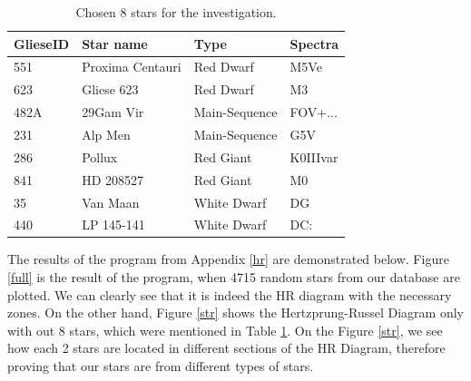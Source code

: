 \documentclass[a4paper,12pt]{article}
\begin{document}
  \begin{table}[h!]
    \begin{center}
      \caption{Chosen 8 stars for the investigation.}
      \begin{tabular}{l | l | l | l}
        \textbf{GlieseID} & \textbf{Star name} & \textbf{Type} & \textbf{Spectra}\\
        \hline
        551 & Proxima Centauri & Red Dwarf & M5Ve\\
        623 & Gliese 623 & Red Dwarf & M3\\
        482A & 29Gam Vir & Main-Sequence & FOV+...\\
        231 & Alp Men & Main-Sequence & G5V\\
        286 & Pollux & Red Giant & K0IIIvar\\
        841 & HD 208527 & Red Giant & M0\\
        35 & Van Maan & White Dwarf & DG\\
        440 & LP 145-141 & White Dwarf & DC:\\
      \end{tabular}
      \label{stars}
    \end{center}
  \end{table}
  
  The results of the program from Appendix \ref{hr} are demonstrated below. Figure \ref{full} is the result of the program, when 4715 random stars from our database are plotted. We can clearly see that it is indeed the HR diagram with the necessary zones. On the other hand, Figure \ref{str} shows the Hertzprung-Russel Diagram only with out 8 stars, which were mentioned in Table \ref{stars}. On the Figure \ref{str}, we see how each 2 stars are located in different sections of the HR Diagram, therefore proving that our stars are from different types of stars. 
  
\end{document}
